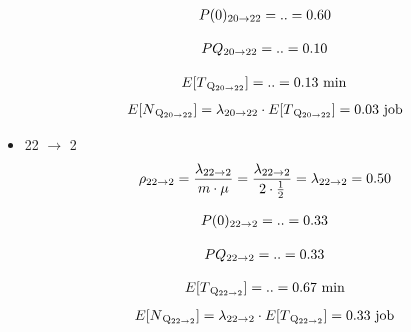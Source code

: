 \documentclass[a4paper, 12pt]{article}
\begin{document}
\begin{itemize}
\[
\begin{aligned}
  P(0)\textsubscript{20$\rightarrow$22} = .. = 0.60 
\end{aligned}
\]

\[
\begin{aligned}
  PQ\textsubscript{20$\rightarrow$22} = .. = 0.10 
\end{aligned}
\]

\[
\begin{aligned}
  E[T\textsubscript{Q\textsubscript{20$\rightarrow$22}}] = .. = 0.13 \text{ min} 
\end{aligned}
\]
\[
\begin{aligned}
  E[N\textsubscript{Q\textsubscript{20$\rightarrow$22}}] = \lambda\textsubscript{20$\rightarrow$22}
\cdot E[T\textsubscript{Q\textsubscript{20$\rightarrow$22}}] = 0.03 \text{ job} 
\end{aligned}
\]


\item 22 $\rightarrow$ 2
\[
\begin{aligned}
  \rho\textsubscript{22$\rightarrow$2} = \frac{\lambda\textsubscript{22$\rightarrow$2}}{m \cdot \mu}
= \frac{\lambda\textsubscript{22$\rightarrow$2}}{2 \cdot \frac{1}{2}} =\lambda\textsubscript{22$\rightarrow$2} = 0.50
\end{aligned}
\]

\[
\begin{aligned}
  P(0)\textsubscript{22$\rightarrow$2} = .. = 0.33 
\end{aligned}
\]

\[
\begin{aligned}
  PQ\textsubscript{22$\rightarrow$2} = .. = 0.33 
\end{aligned}
\]

\[
\begin{aligned}
  E[T\textsubscript{Q\textsubscript{22$\rightarrow$2}}] = .. = 0.67 \text{ min} 
\end{aligned}
\]
\[
\begin{aligned}
  E[N\textsubscript{Q\textsubscript{22$\rightarrow$2}}] = \lambda\textsubscript{22$\rightarrow$2}
\cdot E[T\textsubscript{Q\textsubscript{22$\rightarrow$2}}] = 0.33 \text{ job} 
\end{aligned}
\]
\end{itemize}
\end{document}
